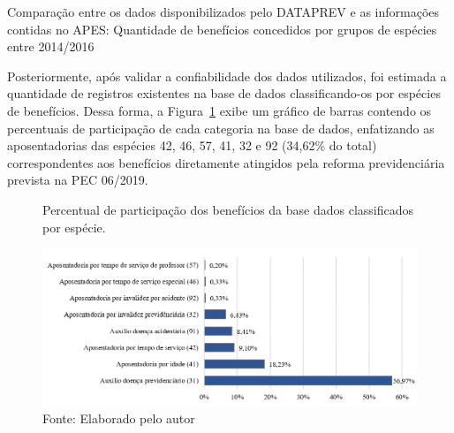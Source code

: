 \begin{table}[!h]
    \caption{Comparação entre os dados disponibilizados pelo DATAPREV e as informações contidas no APES: Quantidade de benefícios concedidos por grupos de espécies entre 2014/2016}
    \caption*{\footnotesize{Fonte: Elaborado pelo autor}}
    \label{fig:cap05:comparacaoaposen}
\end{table}

Posteriormente, após validar a confiabilidade dos dados utilizados, foi estimada a quantidade de registros existentes na base de dados classificando-os por espécies de benefícios. Dessa forma, a Figura~\ref{fig:cap05:percentapo} exibe um gráfico de barras contendo os percentuais de participação de cada categoria na base de dados, enfatizando as aposentadorias das espécies 42, 46, 57, 41, 32 e 92 (34,62\% do total) correspondentes aos benefícios diretamente atingidos pela reforma previdenciária prevista na PEC 06/2019.

\begin{figure}[!h]
    \centering
    \caption{Percentual de participação dos benefícios da base dados classificados por espécie.}
    \includegraphics[width=\textwidth]{figs/cap05_percentual_especies.png}
    \caption*{\footnotesize{Fonte: Elaborado pelo autor}}
    \label{fig:cap05:percentapo}
\end{figure}

